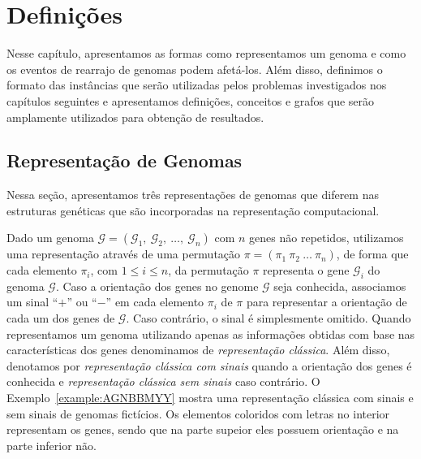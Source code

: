 \chapter{Definições}\label{chapter:CNDSVAJR}

Nesse capítulo, apresentamos as formas como representamos um genoma e como os eventos de rearrajo de genomas podem afetá-los. Além disso, definimos o formato das instâncias que serão utilizadas pelos problemas investigados nos capítulos seguintes e apresentamos definições, conceitos e grafos que serão amplamente utilizados para obtenção de resultados.

\section{Representação de Genomas}

Nessa seção, apresentamos três representações de genomas que diferem nas estruturas genéticas que são incorporadas na representação computacional.

Dado um genoma $\mathcal{G}=(\mathcal{G}_1,\:\mathcal{G}_2,\allowbreak\:\dots,\:\mathcal{G}_n)$ com $n$ genes não repetidos, utilizamos uma representação através de uma permutação $\pi=(\pi_1~\pi_2~\dots~\pi_n)$, de forma que cada elemento $\pi_i$, com $1 \le i \le n$, da permutação $\pi$ representa o gene $\mathcal{G}_i$ do genoma $\mathcal{G}$. Caso a orientação dos genes no genome $\mathcal{G}$ seja conhecida, associamos um sinal ``$+$'' ou ``$-$'' em cada elemento $\pi_i$ de $\pi$ para representar a orientação de cada um dos genes de $\mathcal{G}$. Caso contrário, o sinal é simplesmente omitido. Quando representamos um genoma utilizando apenas as informações obtidas com base nas características dos genes denominamos de \emph{representação clássica}. Além disso, denotamos por \emph{representação clássica com sinais} quando a orientação dos genes é conhecida e \emph{representação clássica sem sinais} caso contrário. O Exemplo~\ref{example:AGNBBMYY} mostra uma representação clássica com sinais e sem sinais de genomas fictícios. Os elementos coloridos com letras no interior representam os genes, sendo que na parte supeior eles possuem orientação e na parte inferior não.



